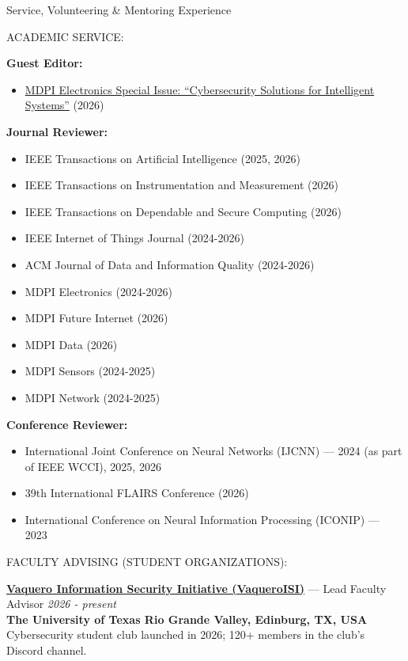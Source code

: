 \documentclass[10pt]{resume} %
\begin{document}
\begin{rSection}{Service, Volunteering \& Mentoring Experience}

\vspace{-10pt}
\item ACADEMIC SERVICE:

\textbf{Guest Editor:}
\begin{itemize}\itemsep-0.5em
\item \href{https://www.mdpi.com/journal/electronics/special_issues/H3RAMJ66OF}{MDPI Electronics Special Issue: ``Cybersecurity Solutions for Intelligent Systems''} (2026)
\end{itemize}

\textbf{Journal Reviewer:}
\begin{itemize}\itemsep-0.5em
\item IEEE Transactions on Artificial Intelligence (2025, 2026)
\item IEEE Transactions on Instrumentation and Measurement (2026)
\item IEEE Transactions on Dependable and Secure Computing (2026)
\item IEEE Internet of Things Journal (2024-2026)
\item ACM Journal of Data and Information Quality (2024-2026)
\item MDPI Electronics (2024-2026)
\item MDPI Future Internet (2026)
\item MDPI Data (2026)
\item MDPI Sensors (2024-2025)
\item MDPI Network (2024-2025)
\end{itemize}

\textbf{Conference Reviewer:}
\begin{itemize}\itemsep-0.5em
\item International Joint Conference on Neural Networks (IJCNN) --- 2024 (as part of IEEE WCCI), 2025, 2026
\item 39th International FLAIRS Conference (2026)
\item International Conference on Neural Information Processing (ICONIP) --- 2023
\end{itemize}

\item FACULTY ADVISING (STUDENT ORGANIZATIONS):

\textbf{\href{https://vaqueroisi.org/}{Vaquero Information Security Initiative (VaqueroISI)}} --- Lead Faculty Advisor \hfill\small{\em 2026 - present}\normalsize \\
\textbf{The University of Texas Rio Grande Valley, Edinburg, TX, USA} \\
Cybersecurity student club launched in 2026; 120+ members in the club's Discord channel.


\end{rSection}
\end{document}
